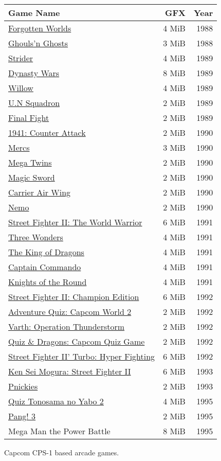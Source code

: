 \begin{figure}[H]
{ \setlength{\tabcolsep}{3.0pt}
\begin{tabularx}{\textwidth}{Xrr} 
  \textbf{Game Name} & \textbf{ GFX }  & \textbf{ Year } \\               
  \toprule    
\href{}{Forgotten Worlds} & 4 MiB & 1988 \\ 
\href{}{Ghouls'n Ghosts} & 3 MiB & 1988 \\ 
  \toprule    
\href{}{Strider} & 4 MiB & 1989 \\ 
\href{}{Dynasty Wars} & 8 MiB & 1989 \\ 
\href{}{Willow} & 4 MiB & 1989 \\ 
\href{}{U.N Squadron} & 2 MiB & 1989 \\ 
\href{}{Final Fight} & 2 MiB & 1989 \\ 
  \toprule    
\href{}{1941: Counter Attack} & 2 MiB &  1990 \\ 
\href{}{Mercs} &  3 MiB & 1990 \\ 
\href{}{Mega Twins} & 2 MiB & 1990 \\ 
\href{}{Magic Sword} & 2 MiB & 1990 \\ 
\href{}{Carrier Air Wing} & 2 MiB  & 1990 \\ 
\href{}{Nemo} & 2 MiB &  1990 \\ 
  \toprule    
\href{}{Street Fighter II: The World Warrior} & 6 MiB & 1991 \\ 
\href{}{Three Wonders} & 4 MiB & 1991 \\ 
\href{}{The King of Dragons} & 4 MiB & 1991 \\ 
\href{}{Captain Commando} &  4 MiB & 1991 \\ 
\href{}{Knights of the Round} & 4 MiB  & 1991 \\ 
  \toprule    
\href{}{Street Fighter II: Champion Edition} & 6 MiB & 1992 \\ 
\href{}{Adventure Quiz: Capcom World 2} & 2 MiB & 1992 \\ 
\href{}{Varth: Operation Thunderstorm} & 2 MiB & 1992 \\ 
\href{}{Quiz \& Dragons: Capcom Quiz Game} & 2 MiB & 1992 \\ 
\href{}{Street Fighter II' Turbo: Hyper Fighting} &  6 MiB & 1992 \\ 
  \toprule    
\href{}{Ken Sei Mogura: Street Fighter II} & 6 MiB & 1993 \\ 
\href{}{Pnickies} & 2 MiB & 1993 \\ 
  \toprule    
\href{}{Quiz Tonosama no Yabo 2} &  4 MiB & 1995 \\ 
\href{}{Pang! 3} & 2 MiB  & 1995 \\ 
Mega Man the Power Battle & 8 MiB  & 1995 \\

\toprule    
\end{tabularx}%
}\caption*{Capcom CPS-1 based arcade games.}
\end{figure}










